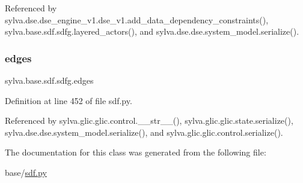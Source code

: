 Referenced by sylva.\+dse.\+dse\+\_\+engine\+\_\+v1.\+dse\+\_\+v1.\+add\+\_\+data\+\_\+dependency\+\_\+constraints(), sylva.\+base.\+sdf.\+sdfg.\+layered\+\_\+actors(), and sylva.\+dse.\+dse.\+system\+\_\+model.\+serialize().

\mbox{\label{classsylva_1_1base_1_1sdf_1_1sdfg_a1c2b2c217ea9a12397686313ae4146d5}} 
\subsubsection{\texorpdfstring{edges}{edges}}
{\footnotesize\ttfamily sylva.\+base.\+sdf.\+sdfg.\+edges}



Definition at line 452 of file sdf.\+py.



Referenced by sylva.\+glic.\+glic.\+control.\+\_\+\+\_\+str\+\_\+\+\_\+(), sylva.\+glic.\+glic.\+state.\+serialize(), sylva.\+dse.\+dse.\+system\+\_\+model.\+serialize(), and sylva.\+glic.\+glic.\+control.\+serialize().



The documentation for this class was generated from the following file\+:\begin{DoxyCompactItemize}
\item 
base/\hyperlink{sdf_8py}{sdf.\+py}\end{DoxyCompactItemize}
